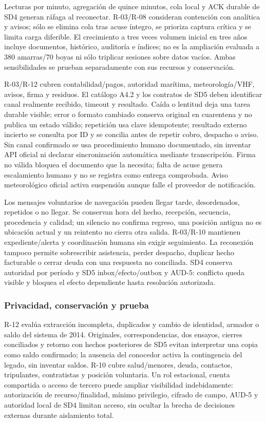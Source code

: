 Lecturas por minuto, agregación de quince minutos, cola local y ACK durable de SD4 generan ráfaga al reconectar. R-03/R-08 consideran contención con analítica y avisos; sólo se elimina cola tras acuse íntegro, se prioriza captura crítica y se limita carga diferible. El crecimiento a tres veces volumen inicial en tres años incluye documentos, histórico, auditoría e índices; no es la ampliación evaluada a 380 amarras/70 boyas ni sólo triplicar sesiones sobre datos vacíos. Ambas sensibilidades se prueban separadamente con sus recursos y conservación. \parencites[RT-05.05; RT-09.01--09; pp.~11, 21--22]{sd8-bt}[numerales 13.2 y 14.1/14.2]{sd8-c07}

R-03/R-12 cubren contabilidad/pagos, autoridad marítima, meteorología/VHF, avisos, firma y residuos. El catálogo A4.2 y los contratos de SD5 deben identificar canal realmente recibido, timeout y resultado. Caída o lentitud deja una tarea durable visible; error o formato cambiado conserva original en cuarentena y no publica un estado válido; repetición usa clave idempotente; resultado externo incierto se consulta por ID y se concilia antes de repetir cobro, despacho o aviso. Sin canal confirmado se usa procedimiento humano documentado, sin inventar API oficial ni declarar sincronización automática mediante transcripción. Firma no válida bloquea el documento que la necesita; falta de acuse genera escalamiento humano y no se registra como entrega comprobada. Aviso meteorológico oficial activa suspensión aunque falle el proveedor de notificación.

Los mensajes voluntarios de navegación pueden llegar tarde, desordenados, repetidos o no llegar. Se conservan hora del hecho, recepción, secuencia, procedencia y calidad; un silencio no confirma regreso, una posición antigua no es ubicación actual y un reintento no cierra otra salida. R-03/R-10 mantienen expediente/alerta y coordinación humana sin exigir seguimiento. La reconexión tampoco permite sobrescribir asistencia, perder despacho, duplicar hecho facturable o cerrar deuda con una respuesta no conciliada. SD4 conserva autoridad por período y SD5 inbox/efecto/outbox y AUD-5: conflicto queda visible y bloquea el efecto dependiente hasta resolución autorizada.

\subsubsection{Privacidad, conservación y prueba}
R-12 evalúa extracción incompleta, duplicados y cambio de identidad, armador o saldo del sistema de 2014. Originales, correspondencias, dos ensayos, cierres conciliados y retorno con hechos posteriores de SD5 evitan interpretar una copia como saldo confirmado; la ausencia del conocedor activa la contingencia del legado, sin inventar saldos. R-10 cubre salud/menores, deuda, contactos, tripulantes, contratistas y posición voluntaria. Un rol estacional, cuenta compartida o acceso de tercero puede ampliar visibilidad indebidamente: autorización de recurso/finalidad, mínimo privilegio, cifrado de campo, AUD-5 y autoridad local de SD4 limitan acceso, sin ocultar la brecha de decisiones externas durante aislamiento total.

